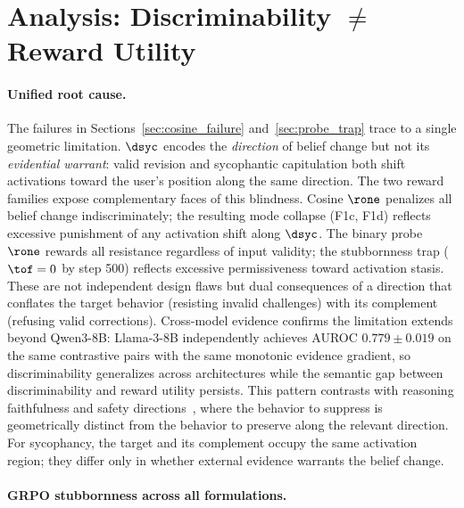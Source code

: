 \section{Analysis: Discriminability $\neq$ Reward Utility}\label{sec:discussion}

\paragraph{Unified root cause.}
The failures in Sections~\ref{sec:cosine_failure} and~\ref{sec:probe_trap} trace to a single geometric limitation.
$\dsyc$ encodes the \emph{direction} of belief change but not its \emph{evidential warrant}: valid revision and sycophantic capitulation both shift activations toward the user's position along the same direction.
The two reward families expose complementary faces of this blindness.
Cosine $\rone$ penalizes all belief change indiscriminately; the resulting mode collapse (F1c, F1d) reflects excessive punishment of any activation shift along $\dsyc$.
The binary probe $\rone$ rewards all resistance regardless of input validity; the stubbornness trap ($\tof = 0$ by step 500) reflects excessive permissiveness toward activation stasis.
These are not independent design flaws but dual consequences of a direction that conflates the target behavior (resisting invalid challenges) with its complement (refusing valid corrections).
Cross-model evidence confirms the limitation extends beyond Qwen3-8B: Llama-3-8B independently achieves AUROC $0.779 \pm 0.019$ on the same contrastive pairs with the same monotonic evidence gradient, so discriminability generalizes across architectures while the semantic gap between discriminability and reward utility persists.
This pattern contrasts with reasoning faithfulness and safety directions~\citep{zhang2026latentgrpo}, where the behavior to suppress is geometrically distinct from the behavior to preserve along the relevant direction.
For sycophancy, the target and its complement occupy the same activation region; they differ only in whether external evidence warrants the belief change.

\paragraph{GRPO stubbornness across all formulations.}

